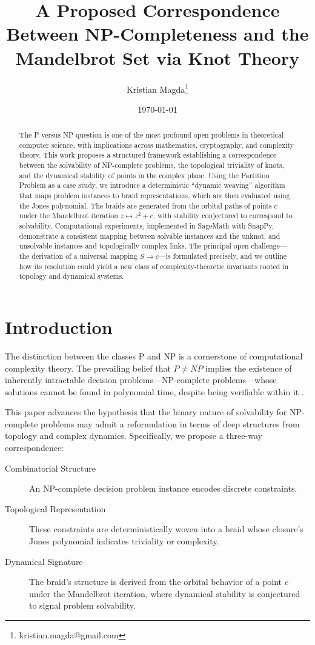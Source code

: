 \documentclass[11pt, a4paper]{article}
\title{A Proposed Correspondence Between NP-Completeness and the Mandelbrot Set via Knot Theory}
\author{Kristian Magda\thanks{kristian.magda@gmail.com}}
\affil{Independent Researcher, USA}
\date{\today}
\begin{document}
\maketitle

\begin{abstract}
\noindent
The P versus NP question is one of the most profound open problems in theoretical computer science, with implications across mathematics, cryptography, and complexity theory. This work proposes a structured framework establishing a correspondence between the solvability of NP-complete problems, the topological triviality of knots, and the dynamical stability of points in the complex plane. Using the Partition Problem as a case study, we introduce a deterministic “dynamic weaving” algorithm that maps problem instances to braid representations, which are then evaluated using the Jones polynomial. The braids are generated from the orbital paths of points $c$ under the Mandelbrot iteration $z \mapsto z^2 + c$, with stability conjectured to correspond to solvability. Computational experiments, implemented in SageMath with SnapPy, demonstrate a consistent mapping between solvable instances and the unknot, and unsolvable instances and topologically complex links. The principal open challenge—the derivation of a universal mapping $S \to c$—is formulated precisely, and we outline how its resolution could yield a new class of complexity-theoretic invariants rooted in topology and dynamical systems.
\end{abstract}


\section{Introduction}

The distinction between the classes P and NP is a cornerstone of computational complexity theory. The prevailing belief that $P \neq NP$ implies the existence of inherently intractable decision problems—NP-complete problems—whose solutions cannot be found in polynomial time, despite being verifiable within it \cite{Cook1971}.

This paper advances the hypothesis that the binary nature of solvability for NP-complete problems may admit a reformulation in terms of deep structures from topology and complex dynamics. Specifically, we propose a three-way correspondence:
\begin{description}
    \item[Combinatorial Structure] An NP-complete decision problem instance encodes discrete constraints.
    \item[Topological Representation] These constraints are deterministically woven into a braid whose closure’s Jones polynomial indicates triviality or complexity.
    \item[Dynamical Signature] The braid’s structure is derived from the orbital behavior of a point $c$ under the Mandelbrot iteration, where dynamical stability is conjectured to signal problem solvability.
\end{description}
\end{document}

